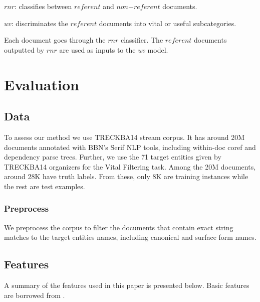 \documentclass{article}
\begin{document}
\begin{itemize*}
    \item $rnr$: classifies between $referent$ and $non\mathord{-}referent$ documents.
    \item $uv$: discriminates the $referent$ documents into vital or useful subcategories.
\end{itemize*}

Each document goes through the $rnr$ classifier. The $referent$ documents outputted by $rnr$ are used as inputs to the $uv$ model.

\section{Evaluation}
\label{evaluation}

\subsection{Data}

To assess our method we use TRECKBA14 stream corpus. It has around 20M documents annotated with BBN's Serif NLP tools, including within-doc coref and dependency parse trees. Further, we use the 71 target entities given by TRECKBA14 organizers for the Vital Filtering task. Among the 20M documents, around 28K have truth labels. From these, only 8K are training instances while the rest are test examples.

\subsubsection{Preprocess}

We preprocess the corpus to filter the documents that contain exact string matches to the target entities names, including canonical and surface form names.

\subsection{Features}
\label{feat}

A summary of the features used in this paper is presented below. Basic features are borrowed from \cite{jingang13}.
\end{document}
